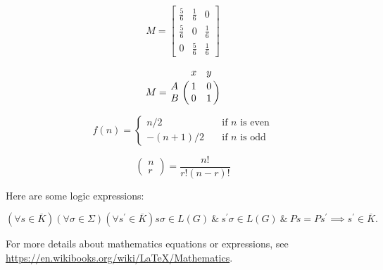 \[
M = \begin{bmatrix}
       \frac{5}{6} & \frac{1}{6} & 0           \\[0.3em]
       \frac{5}{6} & 0           & \frac{1}{6} \\[0.3em]
       0           & \frac{5}{6} & \frac{1}{6}
     \end{bmatrix}
\]


\[
M = \bordermatrix{~ & x & y \cr
                  A & 1 & 0 \cr
                  B & 0 & 1 \cr}
\]


\[ f(n) =
  \begin{cases}
    n/2       & \quad \text{if } n \text{ is even}\\
    -(n+1)/2  & \quad \text{if } n \text{ is odd}
  \end{cases}
\]



\[
\left(
    \begin{array}{c}
      n \\
      r
    \end{array}
  \right) = \frac{n!}{r!(n-r)!}
\]



Here are some logic expressions:


$$
(\forall s\in\overline{K})(\forall\sigma\in\Sigma)(\forall s^\prime\in\overline{K})s\sigma\in L(G)~\&~s^\prime\sigma\in L(G)~\&~Ps=Ps^\prime\implies s^
\prime\in\overline{K}.
$$




For more details about mathematics equations or expressions, see \url{https://en.wikibooks.org/wiki/LaTeX/Mathematics}.